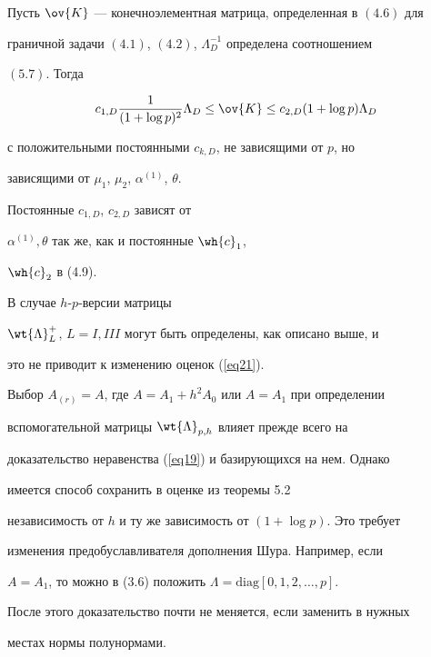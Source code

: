 \begin{thms}


Пусть $\ov{K}$ --- конечноэлементная матрица, определенная в $(4.6)$ для 


граничной задачи $(4.1)$, $(4.2)$, $\Lambda^{-1}_D$ определена соотношением 


$(5.7)$. Тогда


\begin{equation}


c_{1,D} \frac {1}{(1+\log p)^2} \Lambda_D\le\ov{K}


\le c_{2,D} (1+\log p) \Lambda_D


\label{eq21}


\end{equation}


с положительными постоянными $c_{k,D}$, не зависящими от $p$, но 


зависящими от $\mu _1$, $\mu _2$, $\alpha^{(1)}$, $\theta$.


\end{thms}





Постоянные $c_{1,D}$, $c_{2,D}$ зависят от 


$\alpha^{(1)},\theta$ так же, как и постоянные $\wh{c}_1$,


$\wh{c}_2$ в (4.9).





\begin{notes}


В случае $h$-$p$-версии матрицы 


$\wt{\Lambda}_L^+$, $L=I,III$ могут быть определены, как описано выше, и 


это не приводит к изменению оценок (\ref{eq21}).


Выбор $A_{(r)}=A$, где $A=A_1+h^2 A_0$ или $A=A_1$ при определении 


вспомогательной матрицы $\wt{\Lambda}_{p,h}$ влияет прежде всего на 


доказательство неравенства (\ref{eq19}) и базирующихся на нем. Однако


имеется способ сохранить в оценке из теоремы 5.2 


независимость от $h$ и ту же зависимость от $(1+\log p)$. Это требует


изменения предобуславливателя дополнения Шура. Например, если 


$A=A_1$, то можно в (3.6) положить $\Lambda=\text{diag}[0,1,2,\dotsc,p]$. 


После этого доказательство почти не меняется, если заменить в нужных


местах нормы полунормами.


\end{notes}





